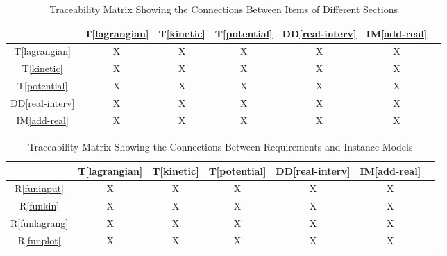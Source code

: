 \documentclass[12pt, titlepage]{article}
\newcommand{\ddref}[1]{DD\ref{#1}}
\newcommand{\tref}[1]{T\ref{#1}}
\newcommand{\iref}[1]{IM\ref{#1}}
\newcommand{\rref}[1]{R\ref{#1}}
\begin{document}
\begin{table}[H]
	\centering
	\label{Table:trace}
	\begin{tabular}{|c|c|c|c|c|c|c|}
		\hline        
		& \tref{lagrangian}
		& \tref{kinetic}
		& \tref{potential}
		& \ddref{real-interv}
		& \iref{add-real} \\
		\hline
        \tref{lagrangian} & X & X & X & X & X \\ \hline
        \tref{kinetic} & X & X & X & X & X\\ \hline
        \tref{potential} & X & X & X & X & X\\ \hline
        \ddref{real-interv} & X & X & X & X & X\\ \hline
        \iref{add-real} & X & X & X & X & X\\ \hline
	\end{tabular}
	\caption{Traceability Matrix Showing the Connections Between Items of 
	Different Sections}
\end{table}


\begin{table}[h!]
	\centering
	\begin{tabular}{|c|c|c|c|c|c|c|}
		\hline        
		& \tref{lagrangian}
		& \tref{kinetic}
		& \tref{potential}
		& \ddref{real-interv}
		& \iref{add-real} \\
		\hline
        \rref{funinput} & X & X & X & X & X \\ \hline
        \rref{funkin} & X & X & X & X & X\\ \hline
        \rref{funlagrang} & X & X & X & X & X \\ \hline
        \rref{funplot} & X & X & X & X & X\\ \hline
	\end{tabular}
	\caption{Traceability Matrix Showing the Connections Between Requirements 
	and Instance Models}
	\label{Table:R_trace}
\end{table}


		
\end{document}
